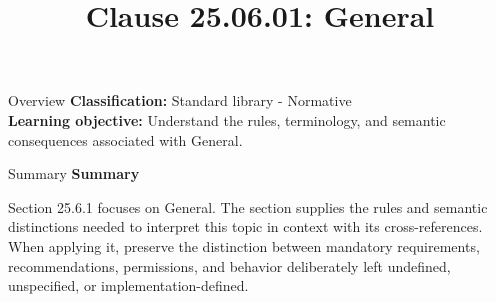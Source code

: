 \documentclass[10pt,letterpaper]{article}
\title{Clause 25.06.01: General}
\author{}
\date{}
\begin{document}
\maketitle
\begin{CornellOverviewBox}{Overview}
\textbf{Classification:} Standard library - Normative\\[2pt]
\textbf{Learning objective:} Understand the rules, terminology, and semantic consequences associated with General.
\end{CornellOverviewBox}\begin{CornellSummaryBox}{Summary}
{\sffamily\bfseries\color{Accent} Summary}\par\vspace{3pt}Section 25.6.1 focuses on General. The section supplies the rules and semantic distinctions needed to interpret this topic in context with its cross-references. When applying it, preserve the distinction between mandatory requirements, recommendations, permissions, and behavior deliberately left undefined, unspecified, or implementation-defined.
\end{CornellSummaryBox}
\end{document}
